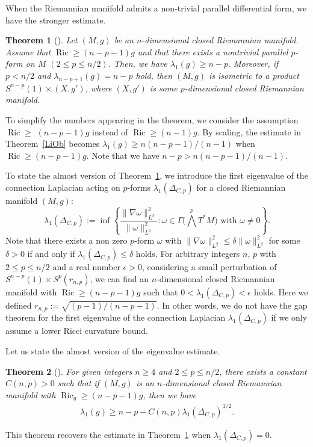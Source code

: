 \documentclass[10pt,a4paper]{amsart}
\numberwithin{equation}{section}
\newtheorem{Thm}{Theorem}[section]
\theoremstyle{definition}
\newcommand{\Ric}{\operatorname{Ric}}
\begin{document}
When the Riemannian manifold admits a non-trivial parallel differential form, we have the stronger estimate.
\begin{Thm}[\cite{ Ai3, gr}]\label{gros}
Let $(M,g)$ be an $n$-dimensional closed Riemannian manifold.
Assume that $\Ric\geq (n-p-1)g$ and that there exists a nontrivial parallel $p$-form on $M$ $(2\leq p\leq n/2)$.
Then, we have
$
\lambda_1(g)\geq n-p.
$
Moreover, if $p<n/2$ and $\lambda_{n-p+1}(g)=n-p$ hold, then $(M,g)$ is isometric to a product $S^{n-p}(1)\times (X,g')$, where $(X,g')$ is some $p$-dimensional closed Riemannian manifold.
\end{Thm}
To simplify the numbers appearing in the theorem, we consider the assumption $\Ric\geq $ \mbox{$(n-p-1)g$} instead of $\Ric\geq (n-1)g$.
By scaling, the estimate in Theorem~\ref{LiOb} becomes $\lambda_1(g)\geq n(n-p-1)/(n-1)$ when $\Ric\geq (n-p-1)g$.
Note that we have $n-p>n(n-p-1)/(n-1)$.

To state the almost version of Theorem~\ref{gros}, we introduce the first eigenvalue of the connection Laplacian acting on $p$-forms $\lambda_1(\Delta_{C,p})$ for a closed Riemannian manifold $(M,g)$:
\[
\lambda_1(\Delta_{C,p}):=\inf\left\{\frac{\|\nabla \omega\|_{L^2}^2}{\|\omega\|_{L^2}^2}\colon \omega\in\Gamma\Big(\bigwedge^p T^\ast M\Big) \text{ with }\omega\neq 0\right\} .
\]
Note that there exists a non zero $p$-form $\omega$ with $\|\nabla \omega\|_{L^2}^2\leq \delta\|\omega\|_{L^2}^2$ for some $\delta>0$ if and only if $\lambda_1(\Delta_{C,p})\leq \delta$ holds.
For arbitrary integers $n$, $p$ with $2\leq p\leq n/2$ and a real number $\epsilon>0$, considering a small perturbation of $S^{n-p}(1)\times S^p(r_{n,p})$, we can find an $n$-dimensional closed Riemannian manifold with $\Ric\geq (n-p-1) g$ such that $0<\lambda_1(\Delta_{C,p})<\epsilon$ holds. Here we defined $r_{n,p}:=\sqrt{(p-1)/(n-p-1)}$.
In other words, we do not have the gap theorem for the first eigenvalue of the connection Laplacian $\lambda_1(\Delta_{C,p})$ if we only assume a lower Ricci curvature bound.


Let us state the almost version of the eigenvalue estimate.
\begin{Thm}[\cite{Ai3}]
For given integers $n\geq 4$ and $2\leq p \leq n/2$, there exists a constant \mbox{$C(n,p)>0$} such that if $(M,g)$ is an $n$-dimensional closed Riemannian manifold with $\Ric_g\geq (n-p-1)g$,
then we have
\begin{gather*}
\lambda_1(g)\geq n-p-C(n,p)\lambda_1(\Delta_{C,p})^{1/2}.
\end{gather*}
\end{Thm}
This theorem recovers the estimate in Theorem~\ref{gros} when $\lambda_1(\Delta_{C,p})=0$.
\end{document}
